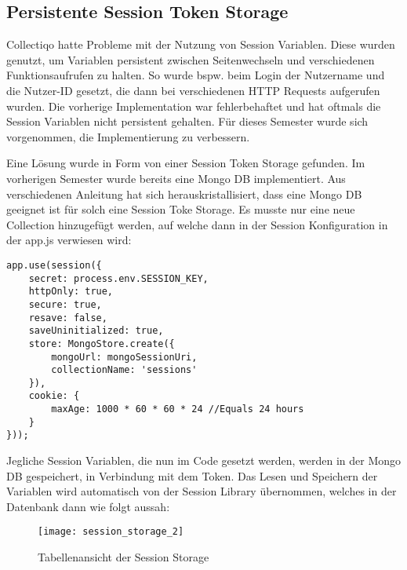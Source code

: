\subsection{Persistente Session Token Storage}\label{subsec:persistente-session-token-storage}
Collectiqo hatte Probleme mit der Nutzung von Session Variablen.
Diese wurden genutzt, um Variablen persistent zwischen Seitenwechseln und verschiedenen Funktionsaufrufen zu halten.
So wurde bspw. beim Login der Nutzername und die Nutzer-ID gesetzt, die dann bei verschiedenen HTTP Requests aufgerufen wurden.
Die vorherige Implementation war fehlerbehaftet und hat oftmals die Session Variablen nicht persistent gehalten.
Für dieses Semester wurde sich vorgenommen, die Implementierung zu verbessern.

Eine Lösung wurde in Form von einer Session Token Storage gefunden.
Im vorherigen Semester wurde bereits eine Mongo DB implementiert.
Aus verschiedenen Anleitung hat sich herauskristallisiert, dass eine Mongo DB geeignet ist für solch eine Session Toke Storage.
Es musste nur eine neue Collection hinzugefügt werden, auf welche dann in der Session Konfiguration in der app.js verwiesen wird:

\vspace{1em}
\lstset{language=javascript}
\begin{lstlisting}[label={lst:sessions}]
app.use(session({
    secret: process.env.SESSION_KEY,
    httpOnly: true,
    secure: true,
    resave: false,
    saveUninitialized: true,
    store: MongoStore.create({
        mongoUrl: mongoSessionUri,
        collectionName: 'sessions'
    }),
    cookie: {
        maxAge: 1000 * 60 * 60 * 24 //Equals 24 hours
    }
}));
\end{lstlisting}
\vspace{1em}

Jegliche Session Variablen, die nun im Code gesetzt werden, werden in der Mongo DB gespeichert, in Verbindung mit dem Token.
Das Lesen und Speichern der Variablen wird automatisch von der Session Library übernommen, welches in der Datenbank dann wie folgt aussah:

\begin{figure}[h]
    \centering
    \texttt{[image: session\_storage\_2]}
    \caption{Tabellenansicht der Session Storage}
    \label{fig:session_storage_2}
\end{figure}